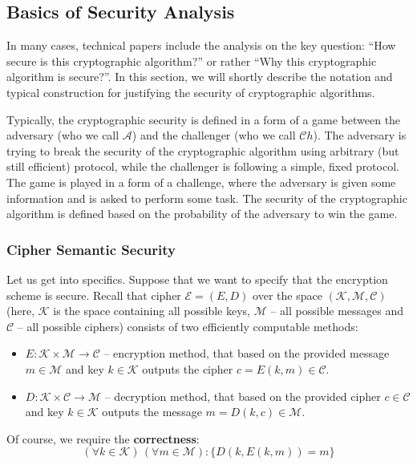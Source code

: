 \documentclass[../lecture-notes.tex]{subfiles}
\begin{document}
\subsection{Basics of Security Analysis}

In many cases, technical papers include the analysis on the key question: ``How secure is this cryptographic algorithm?'' or rather ``Why this cryptographic algorithm is secure?''. In this section, we will shortly describe the notation and typical construction for justifying the security of cryptographic algorithms.

Typically, the cryptographic security is defined in a form of a game between the adversary (who we call $\mathcal{A}$) and the challenger (who we call $\mathcal{C}h$). The adversary is trying to break the security of the cryptographic algorithm using arbitrary (but still efficient) protocol, while the challenger is following a simple, fixed protocol. The game is played in a form of a challenge, where the adversary is given some information and is asked to perform some task. The security of the cryptographic algorithm is defined based on the probability of the adversary to win the game.

\subsubsection{Cipher Semantic Security}
Let us get into specifics. Suppose that we want to specify that the encryption scheme is secure. Recall that cipher $\mathcal{E} = (E,D)$ over the space $(\mathcal{K}, \mathcal{M}, \mathcal{C})$ (here, $\mathcal{K}$ is the space containing all possible keys, $\mathcal{M}$ -- all possible messages and $\mathcal{C}$ -- all possible ciphers) consists of two efficiently computable methods:
\begin{itemize}
    \item $E: \mathcal{K} \times \mathcal{M} \to \mathcal{C}$ -- encryption method, that based on the provided message $m \in \mathcal{M}$ and key $k \in \mathcal{K}$ outputs the cipher $c = E(k,m) \in \mathcal{C}$.
    \item $D: \mathcal{K} \times \mathcal{C} \to \mathcal{M}$ -- decryption method, that based on the provided cipher $c \in \mathcal{C}$ and key $k \in \mathcal{K}$ outputs the message $m = D(k,c) \in \mathcal{M}$.
\end{itemize}

Of course, we require the \textbf{correctness}:
\begin{equation}
    (\forall k \in \mathcal{K}) \, (\forall m \in \mathcal{M}): \{D(k,E(k,m)) = m\}
\end{equation}
\end{document}
